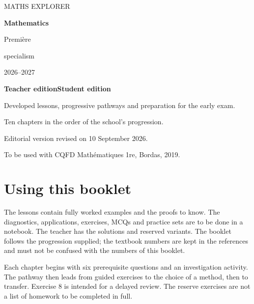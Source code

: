 \begin{titlepage}
\color{mxink}\sffamily
{\large MATHS EXPLORER\par}
\vspace{22mm}
{\fontsize{35}{40}\selectfont\bfseries Mathematics\par}
\vspace{6mm}
{\LARGE Première\par specialism\par}
\vspace{12mm}
{\Large 2026--2027\par}
\vspace{10mm}
\vfill
{\Large\bfseries\ifmxteacher Teacher edition\else Student edition\fi\par}
\vspace{4mm}
Developed lessons, progressive pathways and preparation for the early exam.\par
Ten chapters in the order of the school's progression.\par
\vspace{8mm}
{\small Editorial version revised on 10 September 2026.\par To be used with CQFD Mathématiques 1re, Bordas, 2019.}
\end{titlepage}
\chapter*{Using this booklet}
The lessons contain fully worked examples and the proofs to know. The diagnostics, applications, exercises, MCQs and practice sets are to be done in a notebook. The teacher has the solutions and reserved variants. The booklet follows the progression supplied; the textbook numbers are kept in the references and must not be confused with the numbers of this booklet.

Each chapter begins with six prerequisite questions and an investigation activity. The pathway then leads from guided exercises to the choice of a method, then to transfer. Exercise 8 is intended for a delayed review. The reserve exercises are not a list of homework to be completed in full.

